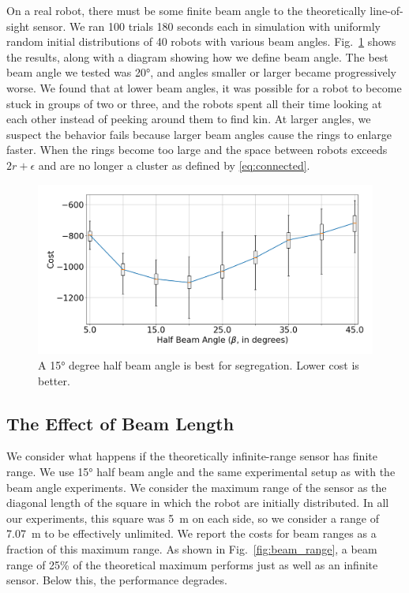 \documentclass[letterpaper, 10 pt, conference]{ieeeconf}
\begin{document}
On a real robot, there must be some finite beam angle to the theoretically
line-of-sight sensor. We ran 100 trials 180 seconds each in simulation with uniformly random
initial distributions of 40 robots with various beam
angles. Fig.~\ref{fig:beam_angle} shows the results, along with a diagram
showing how we define beam angle. The best beam angle we tested was \ang{20},
and angles smaller or larger became progressively worse. We found that at lower
beam angles, it was possible for a robot to become stuck in groups of two or
three, and the robots spent all their time looking at each other instead of
peeking around them to find kin. At larger angles, we suspect the behavior fails
because larger beam angles cause the rings to enlarge faster. When the rings become
too large and the space between robots exceeds $2r+\epsilon$
and are no longer a cluster as defined by \eqref{eq:connected}.

\begin{figure}[t]
  \centering
  \includegraphics[width=1\linewidth]{./images/beam_angle.png}
  \caption{A \ang{15} degree half beam angle is best for segregation. Lower cost is better.}
  \label{fig:beam_angle}
\end{figure}

\subsection{The Effect of Beam Length} \label{section:beam_range}

We consider what happens if the theoretically infinite-range sensor has finite
range. We use \ang{15} half beam angle and the same experimental setup as with
the beam angle experiments. We consider the maximum range of the sensor as the
diagonal length of the square in which the robot are initially distributed. In
all our experiments, this square was \SI{5}{\meter} on each side, so we consider
a range of \SI{7.07}{\meter} to be effectively unlimited. We report the costs
for beam ranges as a fraction of this maximum range. As shown in
Fig.~\ref{fig:beam_range}, a beam range of 25\% of the theoretical maximum
performs just as well as an infinite sensor. Below this, the performance
degrades.
\end{document}
